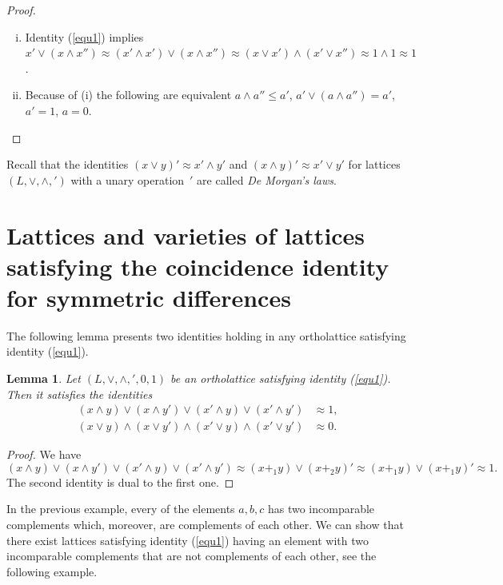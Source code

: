 \documentclass[12pt]{article}
\newtheorem{lemma}[theorem]{Lemma}
\begin{document}
\begin{proof}
\
\begin{enumerate}[(i)]
\item Identity (\ref{equ1}) implies $x'\vee(x\wedge x'')\approx(x'\wedge x')\vee(x\wedge x'')\approx(x\vee x')\wedge(x'\vee x'')\approx1\wedge1\approx1$.
\item Because of (i) the following are equivalent $a\wedge a''\le a'$, $a'\vee(a\wedge a'')=a'$, $a'=1$, $a=0$.
\end{enumerate}
\end{proof}

Recall that the identities $(x\vee y)'\approx x'\wedge y'$ and $(x\wedge y)'\approx x'\vee y'$ for lattices $(L,\vee,\wedge,{}')$ with a unary operation $\,'$ are called {\em De Morgan's laws}.

\section{Lattices and varieties of lattices satisfying the coincidence identity for symmetric differences}

The following lemma presents two identities holding in any ortholattice satisfying identity (\ref{equ1}).

\begin{lemma}
Let $(L,\vee,\wedge,{}',0,1)$ be an ortholattice satisfying identity {\rm(\ref{equ1})}. Then it satisfies the identities
\begin{align*}
(x\wedge y)\vee(x\wedge y')\vee(x'\wedge y)\vee(x'\wedge y') & \approx1, \\
  (x\vee y)\wedge(x\vee y')\wedge(x'\vee y)\wedge(x'\vee y') & \approx0.
\end{align*}
\end{lemma}

\begin{proof}
We have
\[
(x\wedge y)\vee(x\wedge y')\vee(x'\wedge y)\vee(x'\wedge y')\approx(x+_1y)\vee(x+_2y)'\approx(x+_1y)\vee(x+_1y)'\approx1.	
\]
The second identity is dual to the first one.
\end{proof}

In the previous example, every of the elements $a,b,c$ has two incomparable complements which, moreover, are complements of each other. We can show that there exist lattices satisfying identity (\ref{equ1}) having an element with two incomparable complements that are not complements of each other, see the following example.
\end{document}

